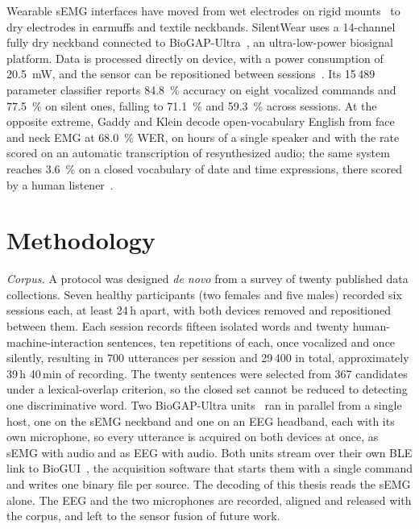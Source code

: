 \documentclass{article}
\begin{document}
Wearable sEMG interfaces have moved from wet electrodes on rigid mounts~\cite{Kapur2018_AlterEgo} to dry electrodes in earmuffs and textile neckbands. SilentWear uses a 14-channel fully dry neckband connected to BioGAP-Ultra~\cite{Frey2026_BioGAPUltra}, an ultra-low-power biosignal platform. Data is processed directly on device, with a power consumption of \SI{20.5}{\milli\watt}, and the sensor can be repositioned between sessions~\cite{Spacone2026_SilentWear}. Its 15\,489 parameter classifier reports \SI{84.8}{\percent} accuracy on eight vocalized commands and \SI{77.5}{\percent} on silent ones, falling to \SI{71.1}{\percent} and \SI{59.3}{\percent} across sessions. At the opposite extreme, Gaddy and Klein decode open-vocabulary English from face and neck EMG at \SI{68.0}{\percent} WER, on hours of a single speaker and with the rate scored on an automatic transcription of resynthesized audio; the same system reaches \SI{3.6}{\percent} on a closed vocabulary of date and time expressions, there scored by a human listener~\cite{Gaddy2020_DigitalVoicing}.

\section{Methodology}

\textit{Corpus.} A protocol was designed \emph{de novo} from a survey of twenty published data collections. Seven healthy participants (two females and five males) recorded six sessions each, at least 24\,h apart, with both devices removed and repositioned between them. Each session records fifteen isolated words and twenty human-machine-interaction sentences, ten repetitions of each, once vocalized and once silently, resulting in 700 utterances per session and 29\,400 in total, approximately 39\,h 40\,min of recording. The twenty sentences were selected from 367 candidates under a lexical-overlap criterion, so the closed set cannot be reduced to detecting one discriminative word. Two BioGAP-Ultra units~\cite{Frey2026_BioGAPUltra} ran in parallel from a single host, one on the sEMG neckband and one on an EEG headband, each with its own microphone, so every utterance is acquired on both devices at once, as sEMG with audio and as EEG with audio. Both units stream over their own BLE link to BioGUI~\cite{Orlandi2024_BioGUI}, the acquisition software that starts them with a single command and writes one binary file per source. The decoding of this thesis reads the sEMG alone. The EEG and the two microphones are recorded, aligned and released with the corpus, and left to the sensor fusion of future work.
\end{document}
